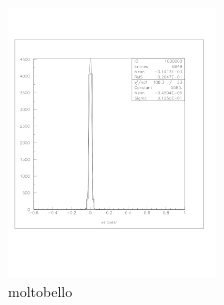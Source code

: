 \documentclass[a4paper]{article}
\begin{document}
\begin{figure}[!htb]
  \includegraphics[width=0.49\textwidth]{ex_images/1_005_140_xse.jpg}
  \caption{moltobello}
  \label{fig:005_xse}
\end{figure}
\end{document}
